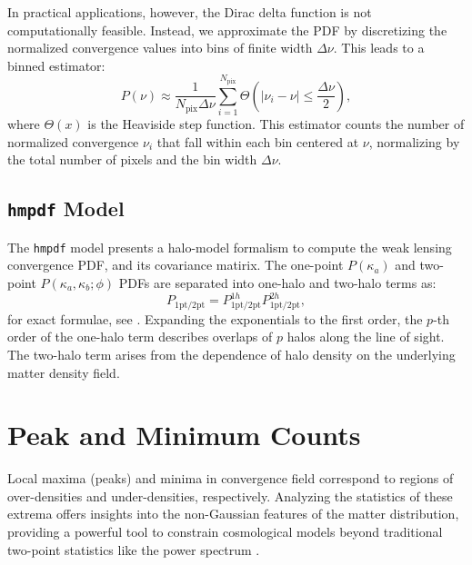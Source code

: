 In practical applications, however, the Dirac delta function is not computationally feasible. Instead, we approximate the PDF by discretizing the normalized convergence values into bins of finite width \(\Delta\nu\). This leads to a binned estimator:
\begin{equation}
    P(\nu) \approx \frac{1}{N_{\mathrm{pix}} \Delta\nu} \sum_{i=1}^{N_{\mathrm{pix}}} \Theta\left(\left|\nu_i - \nu\right| \leq \frac{\Delta\nu}{2}\right),
    \label{eq:pdf_binned}
\end{equation}
where \(\Theta(x)\) is the Heaviside step function. This estimator counts the number of normalized convergence \(\nu_i\) that fall within each bin centered at \(\nu\), normalizing by the total number of pixels and the bin width \(\Delta\nu\).

\subsection{\texttt{hmpdf} Model}
The \texttt{hmpdf} model \citep{2020PhRvD.102l3545T} presents a halo-model formalism to compute the weak lensing convergence PDF, and its covariance matirix. The one-point $P(\kappa_a)$ and two-point $P(\kappa_a, \kappa_b; \phi)$ PDFs are separated into one-halo and two-halo terms as:
\begin{equation}
    P_{\text{1pt/2pt}} = P^{1h}_{\text{1pt/2pt}}P^{2h}_{\text{1pt/2pt}},
    \label{eq:hmpdf}
\end{equation}
for exact formulae, see \cite{2020PhRvD.102l3545T}. Expanding the exponentials to the first order, the $p$-th order of the one-halo term describes overlaps of $p$ halos along the line of sight. The two-halo term arises from the dependence of halo density on the underlying matter density field.

\section{Peak and Minimum Counts}
\label{sec:peak_min_counts}
Local maxima (peaks) and minima in convergence field correspond to regions of over-densities and under-densities, respectively. Analyzing the statistics of these extrema offers insights into the non-Gaussian features of the matter distribution, providing a powerful tool to constrain cosmological models beyond traditional two-point statistics like the power spectrum \citep{2000ApJ...530L...1J, 2010MNRAS.402.1049D}.

